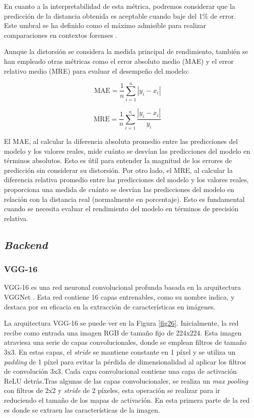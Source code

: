 En cuanto a la interpretabilidad de esta métrica, podremos considerar que la predicción de la distancia obtenida es aceptable cuando baje del 1\% de error. Este umbral se ha definido como el máximo admisible para realizar comparaciones en contextos forenses \cite{55}.

Aunque la distorsión se considera la medida principal de rendimiento, también se han empleado otras métricas como el error absoluto medio (MAE) y el error relativo medio (MRE) para evaluar el desempeño del modelo:

\begin{equation}
	\text{MAE} = \frac{1}{n} \sum_{i=1}^{n} | y_i - x_i |
\end{equation}

\begin{equation}
	\text{MRE} = \frac{1}{n} \sum_{i=1}^{n} \frac{| y_i - x_i |}{y_i}
\end{equation}

El MAE, al calcular la diferencia absoluta promedio entre las predicciones del modelo y los valores reales, mide cuánto se desvían las predicciones del modelo en términos absolutos. Esto es útil para entender la magnitud de los errores de predicción sin considerar su distorsión.
Por otro lado, el MRE, al calcular la diferencia relativa promedio entre las predicciones del modelo y los valores reales, proporciona una medida de cuánto se desvían las predicciones del modelo en relación con la distancia real (normalmente en porcentaje). Esto es fundamental cuando se necesita evaluar el rendimiento del modelo en términos de precisión relativa.

\subsection{\textit{Backend}}\label{backend}

\subsubsection{VGG-16}\label{vgg16}

VGG-16 es una red neuronal convolucional profunda basada en la arquitectura VGGNet \cite{65}. Esta red contiene 16 capas entrenables, como su nombre indica, y destaca por su eficacia en la extracción de características en imágenes.

La arquitectura VGG-16 se puede ver en la Figura \ref{fig26}. Inicialmente, la red recibe como entrada una imagen RGB de tamaño fijo de 224x224. Esta imagen atraviesa una serie de capas convolucionales, donde se emplean filtros de tamaño 3x3. En estas capas, el \textit{stride} se mantiene constante en 1 píxel y se utiliza un \textit{padding} de 1 píxel para evitar la pérdida de dimensionalidad al aplicar los filtros de convolución 3x3. Cada capa convolucional contiene una capa de activación ReLU detrás.Tras algunas de las capas convolucionales, se realiza un \textit{max pooling} con filtros de 2x2 y \textit{stride} de 2 píxeles, esta operación se realizar para ir reduciendo el tamaño de los mapas de activación. En esta primera parte de la red es donde se extraen las características de la imagen.

